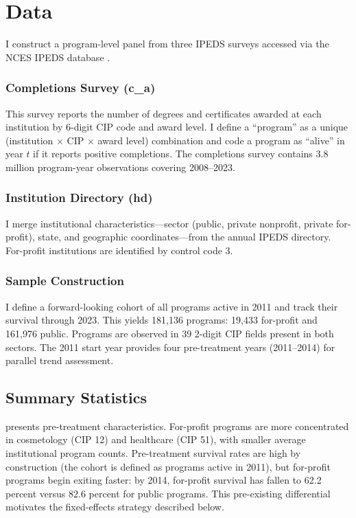 \documentclass[12pt]{article}
\begin{document}
\section{Data}

I construct a program-level panel from three IPEDS surveys accessed via the NCES IPEDS database \citep{deming_goldin_katz2012}.

\subsubsection*{Completions Survey (c\_a)} This survey reports the number of degrees and certificates awarded at each institution by 6-digit CIP code and award level. I define a ``program'' as a unique (institution $\times$ CIP $\times$ award level) combination and code a program as ``alive'' in year $t$ if it reports positive completions. The completions survey contains 3.8 million program-year observations covering 2008--2023.

\subsubsection*{Institution Directory (hd)} I merge institutional characteristics---sector (public, private nonprofit, private for-profit), state, and geographic coordinates---from the annual IPEDS directory. For-profit institutions are identified by control code 3.

\subsubsection*{Sample Construction} I define a forward-looking cohort of all programs active in 2011 and track their survival through 2023. This yields 181,136 programs: 19,433 for-profit and 161,976 public. Programs are observed in 39 2-digit CIP fields present in both sectors. The 2011 start year provides four pre-treatment years (2011--2014) for parallel trend assessment.

\subsection{Summary Statistics}



 presents pre-treatment characteristics. For-profit programs are more concentrated in cosmetology (CIP 12) and healthcare (CIP 51), with smaller average institutional program counts. Pre-treatment survival rates are high by construction (the cohort is defined as programs active in 2011), but for-profit programs begin exiting faster: by 2014, for-profit survival has fallen to 62.2 percent versus 82.6 percent for public programs. This pre-existing differential motivates the fixed-effects strategy described below.
\end{document}
